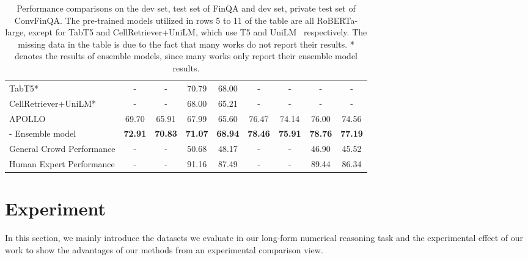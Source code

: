 \documentclass[11pt]{article}
\begin{document}
\begin{table*}[]
{\begin{tabular}{l|cc|cc|cc|cc}
\multicolumn{1}{l|}{TabT5*~\cite{tablet5}}     &    -      &      \multicolumn{1}{c|}{-}      &     70.79           &      \multicolumn{1}{c|}{68.00 }         &       -           &         \multicolumn{1}{c|}{- }        &          -        &       -           \\
\multicolumn{1}{l|}{CellRetriever+UniLM*~\cite{wang2022numerical}}     &    -     &     \multicolumn{1}{c|}{-}   &        68.00        &        \multicolumn{1}{c|}{65.21}      &      -           &         \multicolumn{1}{c|}{-}       &           -       &   -\\ \hline
\multicolumn{1}{l|}{APOLLO}  &    69.70   &     \multicolumn{1}{c|}{65.91}     &      67.99    &     \multicolumn{1}{c|}{65.60}           &      76.47           &       \multicolumn{1}{c|}{74.14 }          &    76.00               &     74.56             \\
\multicolumn{1}{l|}{- Ensemble model}  &  \textbf{72.91} &    \multicolumn{1}{c|}{\textbf{70.83}}  &  \textbf{71.07}   &  \multicolumn{1}{c|}{\textbf{68.94}}  &  \textbf{78.46}  &  \multicolumn{1}{c|}{\textbf{75.91}}  &  \textbf{78.76}   &  \textbf{77.19} \\ \hline
\multicolumn{1}{l|}{General Crowd Performance}   &     -    &  \multicolumn{1}{c|}{-}      &     50.68         &     \multicolumn{1}{c|}{48.17}       &         -        &          \multicolumn{1}{c|}{-}      &      46.90            &     45.52             \\
\multicolumn{1}{l|}{Human Expert Performance}    &    -       &     \multicolumn{1}{c|}{-}      &     91.16    &      \multicolumn{1}{c|}{87.49}      &        -      &         \multicolumn{1}{c|}{-}      &        89.44          &     86.34             \\ \hline
\end{tabular}
}
\caption{Performance comparisons on the dev set, test set of FinQA and dev set, private test set of ConvFinQA. The pre-trained models utilized in rows 5 to 11 of the table are all RoBERTa-large, except for TabT5 and CellRetriever+UniLM, which use T5 and UniLM~\cite{dong2019unified} respectively. The missing data in the table is due to the fact that many works do not report their results. * denotes the results of ensemble models, since many works only report their ensemble model results.
}
\label{table:generator}
\end{table*}


\section{Experiment}
In this section, we mainly introduce the datasets we evaluate in our long-form numerical reasoning task and the experimental effect of our work to show the advantages of our methods from an experimental comparison view. 
\end{document}
